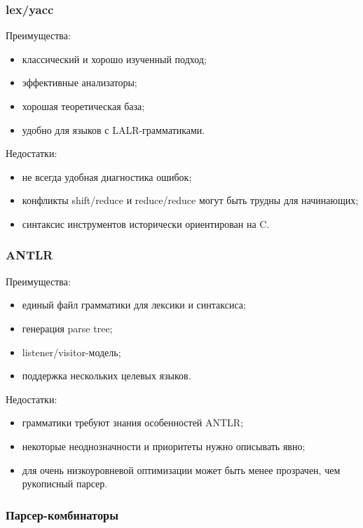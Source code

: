 \documentclass[12pt,a4paper]{article}
\theoremstyle{definition}
\theoremstyle{plain}
\begin{document}
\subsubsection*{lex/yacc}

Преимущества:
\begin{itemize}
    \item классический и хорошо изученный подход;
    \item эффективные анализаторы;
    \item хорошая теоретическая база;
    \item удобно для языков с LALR-грамматиками.
\end{itemize}

Недостатки:
\begin{itemize}
    \item не всегда удобная диагностика ошибок;
    \item конфликты shift/reduce и reduce/reduce могут быть трудны для начинающих;
    \item синтаксис инструментов исторически ориентирован на C.
\end{itemize}

\subsubsection*{ANTLR}

Преимущества:
\begin{itemize}
    \item единый файл грамматики для лексики и синтаксиса;
    \item генерация parse tree;
    \item listener/visitor-модель;
    \item поддержка нескольких целевых языков.
\end{itemize}

Недостатки:
\begin{itemize}
    \item грамматики требуют знания особенностей ANTLR;
    \item некоторые неоднозначности и приоритеты нужно описывать явно;
    \item для очень низкоуровневой оптимизации может быть менее прозрачен, чем рукописный парсер.
\end{itemize}

\subsubsection*{Парсер-комбинаторы}
\end{document}
